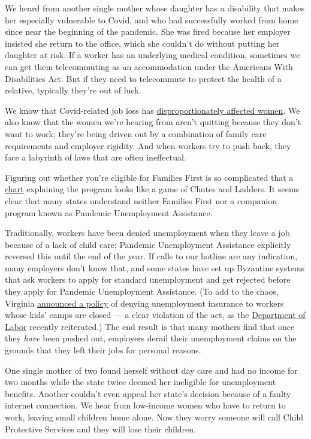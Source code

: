 We heard from another single mother whose daughter has a disability that
makes her especially vulnerable to Covid, and who had successfully
worked from home since near the beginning of the pandemic. She was fired
because her employer insisted she return to the office, which she
couldn't do without putting her daughter at risk. If a worker has an
underlying medical condition, sometimes we can get them telecommuting as
an accommodation under the Americans With Disabilities Act. But if they
need to telecommute to protect the health of a relative, typically
they're out of luck.

We know that Covid-related job loss has
\href{https://nyti.ms/2LijQEA}{disproportionately affected women}. We
also know that the women we're hearing from aren't quitting because they
don't want to work; they're being driven out by a combination of family
care requirements and employer rigidity. And when workers try to push
back, they face a labyrinth of laws that are often ineffectual.

Figuring out whether you're eligible for Families First is so
complicated that a
\href{https://www.lw.com/thoughtLeadership/lw-ffcra-leave}{chart}
explaining the program looks like a game of Chutes and Ladders. It seems
clear that many states understand neither Families First nor a companion
program known as Pandemic Unemployment Assistance.

Traditionally, workers have been denied unemployment when they leave a
job because of a lack of child care; Pandemic Unemployment Assistance
explicitly reversed this until the end of the year. If calls to our
hotline are any indication, many employers don't know that, and some
states have set up Byzantine systems that ask workers to apply for
standard unemployment and get rejected before they apply for Pandemic
Unemployment Assistance. (To add to the chaos, Virginia
\href{https://www.richmond.com/news/virginia/when-the-school-year-ends-parents-cant-claim-unemployment-for-lack-of-child-care-state/article_c9d39f96-adcf-5054-8b44-b9a19fa425c8.html}{announced
a policy} of denying unemployment insurance to workers whose kids' camps
are closed --- a clear violation of the act, as the
\href{https://www.dol.gov/sites/dolgov/files/WHD/legacy/files/fab_2020_4.pdf}{Department
of Labor} recently reiterated.) The end result is that many mothers find
that once they \emph{have} been pushed out, employers derail their
unemployment claims on the grounds that they left their jobs for
personal reasons.

One single mother of two found herself without day care and had no
income for two months while the state twice deemed her ineligible for
unemployment benefits. Another couldn't even appeal her state's decision
because of a faulty internet connection. We hear from low-income women
who have to return to work, leaving small children home alone. Now they
worry someone will call Child Protective Services and they will lose
their children.


